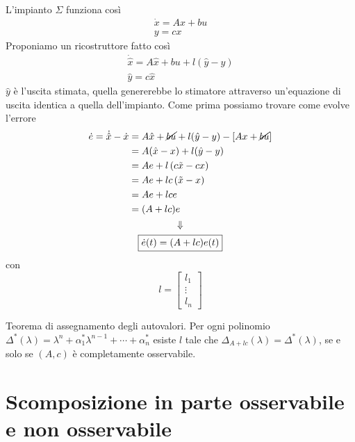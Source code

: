 \documentclass[10pt,a4paper]{book}
\begin{document}
L'impianto $\Sigma $ funziona così
\begin{gather*}
	\dot{x} =Ax+bu\\
	y=cx
\end{gather*}
Proponiamo un ricostruttore fatto così
\begin{gather*}
	\boxed{\dot{\hat{x}} =A\hat{x} +bu+l(\hat{y} -y)}\\
	\hat{y} =c\hat{x}
\end{gather*}
$\hat{y}$ è l'uscita stimata, quella genererebbe lo stimatore attraverso un'equazione di uscita identica a quella dell'impianto. Come prima possiamo trovare come evolve l'errore
\begin{gather*}
	\begin{aligned}
		\dot{e} =\dot{\hat{x}} -\dot{x} & =A\hat{x} +\cancel{bu} +l(\hat{y} -y) -\left[ Ax+\cancel{bu}\right] \\
		                                & =A(\hat{x} -x) +l(\hat{y} -y)                                       \\
		                                & =Ae+l\left(c\tilde{x} -cx\right)                                    \\
		                                & =Ae+lc\left(\tilde{x} -x\right)                                     \\
		                                & =Ae+lce                                                             \\
		                                & =(A+lc) e                                                           
	\end{aligned}\\
	\Downarrow \\
	\boxed{\dot{e}(t) =(A+lc) e(t)}
\end{gather*}
con
\begin{equation*}
	l=\begin{bmatrix}
	l_1\\
	\vdots \\
	l_n
	\end{bmatrix}
\end{equation*}
\begin{theorem}
	Teorema di assegnamento degli autovalori. Per ogni polinomio $\Delta ^{*}(\lambda) =\lambda ^n +\alpha ^{*}_1 \lambda ^{n-1} +\cdots +\alpha ^{*}_n$ esiste $l$ tale che $\Delta _{A+lc}(\lambda) =\Delta ^{*}(\lambda)$, se e solo se $(A,c)$ è completamente osservabile.
\end{theorem}
\section{Scomposizione in parte osservabile e non osservabile}
\end{document}
